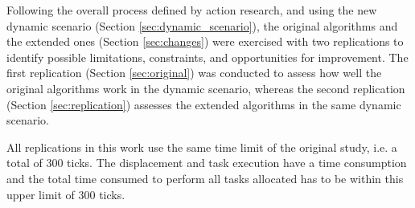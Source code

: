 Following the overall process defined by action research, and using the new dynamic scenario (Section \ref{sec:dynamic_scenario}), the original algorithms and the extended ones (Section \ref{sec:changes}) were exercised with two replications to identify possible limitations, constraints, and opportunities for improvement. The first replication (Section \ref{sec:original}) was conducted to assess how well the original algorithms work in the dynamic scenario, whereas the second replication (Section \ref{sec:replication}) assesses the extended algorithms in the same dynamic scenario.

All replications in this work use the same time limit of the original study, i.e. a total of 300 ticks. The displacement and task execution have a time consumption and the total time consumed to perform all tasks allocated has to be within this upper limit of 300 ticks.


